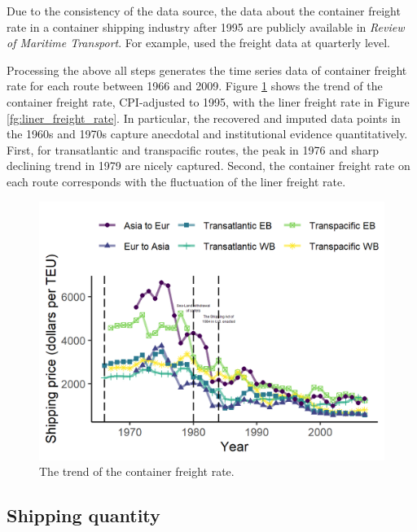 Due to the consistency of the data source, the data about the container freight rate in a container shipping industry after 1995 are publicly available in \textit{Review of Maritime Transport}. For example, \cite{jeon2017learning} used the freight data at quarterly level.


Processing the above all steps generates the time series data of container freight rate for each route between 1966 and 2009. Figure \ref{fg:container_freight_rate_each_route} shows the trend of the container freight rate, CPI-adjusted to 1995, with the liner freight rate in Figure \ref{fg:liner_freight_rate}. In particular, the recovered and imputed data points in the 1960s and 1970s capture anecdotal and institutional evidence quantitatively. First, for transatlantic and transpacific routes, the peak in 1976 and sharp declining trend in 1979 are nicely captured. Second, the container freight rate on each route corresponds with the fluctuation of the liner freight rate.

\begin{figure}[!ht]
\begin{center}
\includegraphics[height = 0.5\textheight]{figuretable/container_freight_rate_each_route.png}
\end{center}
\caption{The trend of the container freight rate.}
\label{fg:container_freight_rate_each_route}
\end{figure}

\subsection{Shipping quantity}

